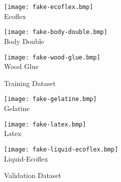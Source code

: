 
\begin{figure}[!htb]
    \begin{minipage}[r]{0.5\textwidth}
        \begin{minipage}[r]{0.3\textwidth}
            \centering
            \texttt{[image: fake-ecoflex.bmp]}
            \vspace{-5mm} \\ Ecoflex
        \end{minipage}
        \begin{minipage}[r]{0.3\textwidth}
            \centering
            \texttt{[image: fake-body-double.bmp]}
            \vspace{-5mm} \\ Body Double
        \end{minipage}
        \begin{minipage}[r]{0.3\textwidth}
            \centering
            \texttt{[image: fake-wood-glue.bmp]}
            \vspace{-5mm} \\ Wood Glue
        \end{minipage}
        \caption{Training Dataset}
    \end{minipage}
    \vrule
    \begin{minipage}[r]{0.5\textwidth}
        \begin{minipage}[r]{0.3\textwidth}
            \centering
            \texttt{[image: fake-gelatine.bmp]}
            \vspace{-5mm} \\ Gelatine
        \end{minipage}
        \begin{minipage}[r]{0.3\textwidth}
            \centering
            \texttt{[image: fake-latex.bmp]}
            \vspace{-5mm} \\ Latex
        \end{minipage}
        \begin{minipage}[r]{0.3\textwidth}
            \centering
            \texttt{[image: fake-liquid-ecoflex.bmp]}
            \vspace{-5mm} \\ Liquid-Ecoflex
        \end{minipage}
        \caption{Validation Dataset}
    \end{minipage}
\end{figure}